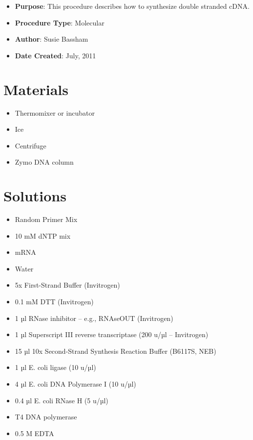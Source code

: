 \documentclass[
  letterpaper,
  DIV=11,
  numbers=noendperiod]{scrreprt}
\providecommand{\tightlist}{%
  \setlength{\itemsep}{0pt}\setlength{\parskip}{0pt}}\usepackage{longtable,booktabs,array}
\begin{document}
\begin{itemize}
\item
  \textbf{Purpose}: This procedure describes how to synthesize double
  stranded cDNA.
\item
  \textbf{Procedure Type}: Molecular
\item
  \textbf{Author}: Susie Bassham
\item
  \textbf{Date Created}: July, 2011
\end{itemize}

\hypertarget{materials-12}{%
\section{Materials}\label{materials-12}}

\begin{itemize}
\tightlist
\item
  Thermomixer or incubator
\item
  Ice
\item
  Centrifuge
\item
  Zymo DNA column
\end{itemize}

\hypertarget{solutions-12}{%
\section{Solutions}\label{solutions-12}}

\begin{itemize}
\tightlist
\item
  Random Primer Mix
\item
  10 mM dNTP mix
\item
  mRNA
\item
  Water
\item
  5x First-Strand Buffer (Invitrogen)
\item
  0.1 mM DTT (Invitrogen)
\item
  1 µl RNase inhibitor -- e.g., RNAseOUT (Invitrogen)
\item
  1 µl Superscript III reverse transcriptase (200 u/µl -- Invitrogen)
\item
  15 µl 10x Second-Strand Synthesis Reaction Buffer (B6117S, NEB)
\item
  1 µl E. coli ligase (10 u/µl)
\item
  4 µl E. coli DNA Polymerase I (10 u/µl)
\item
  0.4 µl E. coli RNase H (5 u/µl)
\item
  T4 DNA polymerase
\item
  0.5 M EDTA
\end{itemize}
\end{document}
